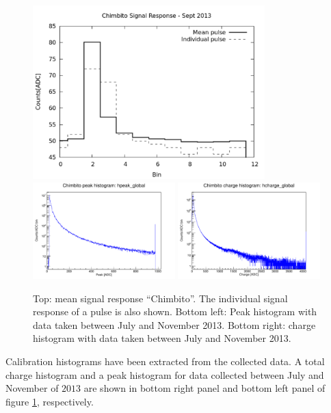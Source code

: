  \begin{figure}[!ht]
  \centering
 \includegraphics[width=0.8\textwidth]{images/ecuador/promedioSep21h}
 \includegraphics[width=0.49\textwidth]{images/ecuador/peak_histo_chimbito_jul_nov_2013}
 \includegraphics[width=0.49\textwidth]{images/ecuador/charge_histo_chimbito_jul_nov_2013}
  \caption{Top: mean signal response ``Chimbito''. The individual signal response of a pulse is also shown. Bottom left: Peak histogram with data taken between July and November 2013. Bottom right: charge histogram with data taken between July and November 2013.}
  \label{fig:results-ecu}
 \end{figure}

Calibration histograms have been extracted from the collected data. A total
charge histogram and a peak histogram for data collected between July and
November of $2013$ are shown in bottom right panel and bottom left panel of
figure \ref{fig:results-ecu}, respectively. 

